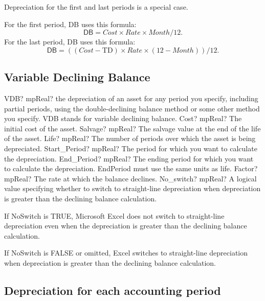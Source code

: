 Depreciation for the first and last periods is a special case. 

For the first period, DB uses this formula:
\begin{equation}
	\textsf{DB} = Cost \times Rate \times Month / 12. 
\end{equation}
For the last period, DB uses this formula:
\begin{equation}
	\textsf{DB} = ((Cost - \text{TD}) \times Rate \times (12 - Month)) / 12.
\end{equation}




\subsection{Variable Declining Balance}

\begin{mpFunctionsExtract}
	\mpWorksheetFunctionSevenNotImplemented
	{VDB? mpReal? the depreciation of an asset for any period you specify, including partial periods, using the double-declining balance method or some other method you specify. VDB stands for variable declining balance.}
	{Cost? mpReal?  The initial cost of the asset.}
	{Salvage? mpReal? The salvage value at the end of the life of the asset.}
	{Life? mpReal? The number of periods over which the asset is being depreciated.}
	{Start\_Period? mpReal? The period for which you want to calculate the depreciation.}
	{End\_Period? mpReal? The ending period for which you want to calculate the depreciation. EndPeriod must use the same units as life.}
	{Factor? mpReal? The rate at which the balance declines.}
	{No\_switch? mpReal? A logical value specifying whether to switch to straight-line depreciation when depreciation is greater than the declining balance calculation.}
\end{mpFunctionsExtract}


\vspace{0.3cm}
If NoSwitch is TRUE, Microsoft Excel does not switch to straight-line depreciation even when the depreciation is greater than the declining balance calculation.

If NoSwitch is FALSE or omitted, Excel switches to straight-line depreciation when depreciation is greater than the declining balance calculation.



\subsection{Depreciation for each accounting period}


